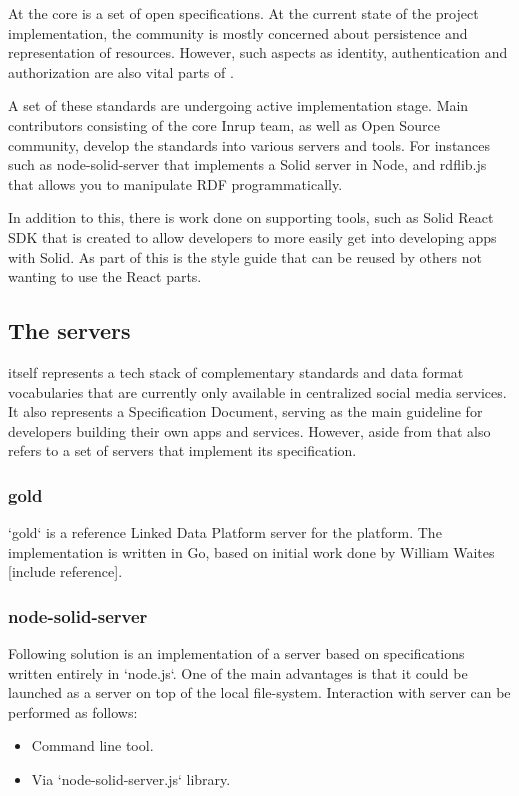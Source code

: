 At the core \solid{} is a set of open specifications. At the current state of the project implementation, the community is mostly concerned about persistence and representation of resources. However, such aspects as identity, authentication and authorization are also vital parts of \solid{}.

A set of these standards are undergoing active implementation stage. Main contributors consisting of the core \solid{} Inrup team, as well as Open Source community, develop the standards into various servers and tools. For instances such as node-solid-server that implements a Solid server in Node, and rdflib.js that allows you to manipulate RDF programmatically.

In addition to this, there is work done on supporting tools, such as Solid React SDK that is created to allow developers to more easily get into developing apps with Solid. As part of this is the style guide that can be reused by others not wanting to use the React parts.

\subsection{The \solid{} servers}

\solid{} itself represents a tech stack of complementary standards and data format vocabularies that are currently only available in centralized social media services. It also represents a Specification Document, serving as the main guideline for developers building their own apps and services. However, aside from that \solid{} also refers to a set of servers that implement its specification. 

\subsubsection{gold}

`gold` is a reference Linked Data Platform server for the \solid{} platform. The implementation is written in Go, based on initial work done by William Waites [include reference].


\subsubsection{node-solid-server}

Following solution is an implementation of a server based on \solid{} specifications written entirely in `node.js`.
One of the main advantages is that it could be launched as a \solid{} server on top of the local file-system. Interaction with server can be performed as follows:
\begin{itemize}
	\item Command line tool.
    \item Via `node-solid-server.js` library.
\end{itemize}

